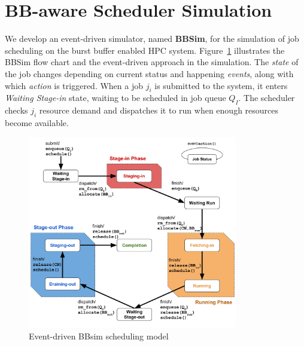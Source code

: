 

\section{BB-aware Scheduler Simulation}
\label{Sec:Simulation}

We develop an event-driven simulator, named \textbf{BBSim},
for the simulation of job scheduling on the burst buffer enabled HPC system.
Figure~\ref{Fig:JobFSM} illustrates the BBSim flow chart and the event-driven approach in the simulation.
The \textit{state} of the job changes depending on current status and
happening \textit{events}, along with which \textit{action} is triggered.
When a job $j_i$ is submitted to the system, 
it enters \textit{Waiting Stage-in} state, 
waiting to be scheduled in job queue $Q_I$. 
The scheduler checks $j_i$ resource demand and 
dispatches it to run when enough resources become available.

\begin{figure}[!t]
\centering
        \includegraphics[width=3.6in]{3PhaseJobFSM}
        \caption{Event-driven BBsim scheduling model}
\label{Fig:JobFSM}
\end{figure}

